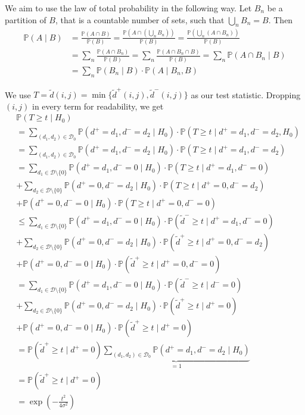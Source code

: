 \documentclass[a4paper,12pt]{article}
\theoremstyle{plain}
\theoremstyle{definition}
\theoremstyle{remark}
\begin{document}
We aim to use the law of total probability in the following way. Let $B_n$ be a partition of $B$, that is a countable number of sets, such that $\bigcup_n B_n = B$. Then
\begin{align*}
	\mathbb{P}(A \mid B) &= \frac{\mathbb{P}(A \cap B)}{\mathbb{P}(B)} = \frac{\mathbb{P}(A \cap (\bigcup_n B_n ))}{\mathbb{P}(B)} = \frac{\mathbb{P}(\bigcup_n (A \cap B_n))}{\mathbb{P}(B)} \\
	&= \sum_n \frac{\mathbb{P}(A \cap B_n)}{\mathbb{P}(B)} = \sum_n \frac{\mathbb{P}(A \cap B_n \cap B)}{\mathbb{P}(B)} = \sum_n \mathbb{P}(A \cap B_n \mid B) \\
	&= \sum_n \mathbb{P}(B_n \mid B) \cdot \mathbb{P}(A \mid B_n, B)
\end{align*}

We use $T = \tilde{d}(i, j) = \min \{ \tilde{d}^+(i, j), \tilde{d}^-(i, j) \}$ as our test statistic. Dropping $(i, j)$ in every term for readability, we get
\begin{align*}
	&\mathbb{P}(T \geq t \mid H_0) \\
	&= \sum_{(d_1, d_2) \in \mathcal{D}_0} \mathbb{P}(d^+ = d_1, d^- = d_2 \mid H_0) \cdot \mathbb{P}(T \geq t \mid d^+ = d_1, d^- = d_2, H_0) \\
	&= \sum_{(d_1, d_2) \in \mathcal{D}_0} \mathbb{P}(d^+ = d_1, d^- = d_2 \mid H_0) \cdot \mathbb{P}(T \geq t \mid d^+ = d_1, d^- = d_2) \\
	&= \sum_{d_1 \in \mathcal{D} \setminus \{ 0 \}} \mathbb{P}(d^+ = d_1, d^- = 0 \mid H_0) \cdot \mathbb{P}(T \geq t \mid d^+ = d_1, d^- = 0) \\
	&+ \sum_{d_2 \in \mathcal{D} \setminus \{ 0 \}} \mathbb{P}(d^+ = 0, d^- = d_2 \mid H_0) \cdot \mathbb{P}(T \geq t \mid d^+ = 0, d^- = d_2) \\
	&+ \mathbb{P}(d^+ = 0, d^- = 0 \mid H_0) \cdot \mathbb{P}(T \geq t \mid d^+ = 0, d^- = 0) \\
	&\leq \sum_{d_1 \in \mathcal{D} \setminus \{ 0 \}} \mathbb{P}(d^+ = d_1, d^- = 0 \mid H_0) \cdot \mathbb{P}(\tilde{d}^- \geq t \mid d^+ = d_1, d^- = 0) \\
	&+ \sum_{d_2 \in \mathcal{D} \setminus \{ 0 \}} \mathbb{P}(d^+ = 0, d^- = d_2 \mid H_0) \cdot \mathbb{P}(\tilde{d}^+ \geq t \mid d^+ = 0, d^- = d_2) \\
	&+ \mathbb{P}(d^+ = 0, d^- = 0 \mid H_0) \cdot \mathbb{P}(\tilde{d}^+ \geq t \mid d^+ = 0, d^- = 0) \\
	&= \sum_{d_1 \in \mathcal{D} \setminus \{ 0 \}} \mathbb{P}(d^+ = d_1, d^- = 0 \mid H_0) \cdot \mathbb{P}(\tilde{d}^- \geq t \mid d^- = 0) \\
	&+ \sum_{d_2 \in \mathcal{D} \setminus \{ 0 \}} \mathbb{P}(d^+ = 0, d^- = d_2 \mid H_0) \cdot \mathbb{P}(\tilde{d}^+ \geq t \mid d^+ = 0) \\
	&+ \mathbb{P}(d^+ = 0, d^- = 0 \mid H_0) \cdot \mathbb{P}(\tilde{d}^+ \geq t \mid d^+ = 0) \\
	&= \mathbb{P}(\tilde{d}^+ \geq t \mid d^+ = 0) \underbrace{\sum_{(d_1, d_2) \in \mathcal{D}_0} \mathbb{P}(d^+ = d_1, d^- = d_2 \mid H_0)}_{= 1} \\
	&= \mathbb{P}(\tilde{d}^+ \geq t \mid d^+ = 0) \\
	&= \exp \left( - \frac{t^2}{4 \sigma^2} \right)
\end{align*}
\end{document}

